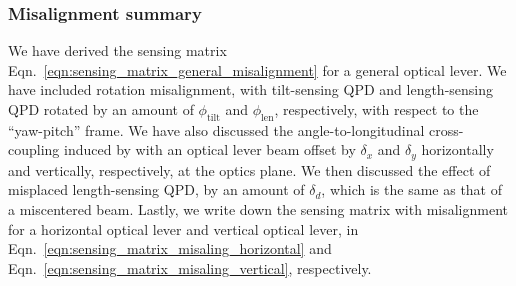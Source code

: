 \subsubsection{Misalignment summary}
We have derived the sensing matrix Eqn.~\eqref{eqn:sensing_matrix_general_misalignment} for a general optical lever.
We have included rotation misalignment, with tilt-sensing QPD and length-sensing QPD rotated by an amount of $\phi_\mathrm{tilt}$ and $\phi_\mathrm{len}$, respectively, with respect to the ``yaw-pitch'' frame.
We have also discussed the angle-to-longitudinal cross-coupling induced by with an optical lever beam offset by $\delta_x$ and $\delta_y$ horizontally and vertically, respectively, at the optics plane.
We then discussed the effect of misplaced length-sensing QPD, by an amount of $\delta_d$, which is the same as that of a miscentered beam.
Lastly, we write down the sensing matrix with misalignment for a horizontal optical lever and vertical optical lever, in Eqn.~\eqref{eqn:sensing_matrix_misaling_horizontal} and Eqn.~\eqref{eqn:sensing_matrix_misaling_vertical}, respectively.


